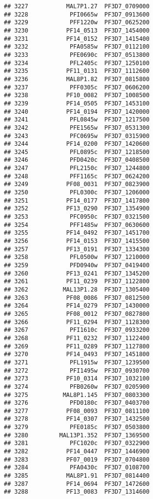 \documentclass{article}\usepackage[]{graphicx}\usepackage[]{color}
\makeatletter
\newenvironment{kframe}{%
 \def\at@end@of@kframe{}%
 \ifinner\ifhmode%
  \def\at@end@of@kframe{\end{minipage}}%
  \begin{minipage}{\columnwidth}%
 \fi\fi%
 \def\FrameCommand##1{\hskip\@totalleftmargin \hskip-\fboxsep
 \colorbox{shadecolor}{##1}\hskip-\fboxsep
     \hskip-\linewidth \hskip-\@totalleftmargin \hskip\columnwidth}%
 \MakeFramed {\advance\hsize-\width
   \@totalleftmargin\z@ \linewidth\hsize
   \@setminipage}}%
 {\par\unskip\endMakeFramed%
 \at@end@of@kframe}
\newenvironment{knitrout}{}{} %
\makeatother
\begin{document}
\begin{knitrout}
\begin{kframe}
\begin{verbatim}
## 3227           MAL7P1.27  PF3D7_0709000
## 3228            PFI0665w  PF3D7_0913600
## 3229            PFF1220w  PF3D7_0625200
## 3230           PF14_0513  PF3D7_1454000
## 3231           PF14_0152  PF3D7_1415400
## 3232            PFA0585w  PF3D7_0112100
## 3233            PFE0690c  PF3D7_0513800
## 3234            PFL2405c  PF3D7_1250100
## 3235           PF11_0131  PF3D7_1112600
## 3236           MAL8P1.82  PF3D7_0815800
## 3237            PFF0305c  PF3D7_0606200
## 3238           PF10_0082  PF3D7_1008500
## 3239           PF14_0505  PF3D7_1453100
## 3240           PF14_0194  PF3D7_1420000
## 3241            PFL0845w  PF3D7_1217500
## 3242            PFE1565w  PF3D7_0531300
## 3243            PFC0695w  PF3D7_0315900
## 3244           PF14_0200  PF3D7_1420600
## 3245            PFL0895c  PF3D7_1218500
## 3246            PFD0420c  PF3D7_0408500
## 3247            PFL2150c  PF3D7_1244800
## 3248            PFF1165c  PF3D7_0624200
## 3249           PF08_0031  PF3D7_0823900
## 3250            PFL0300c  PF3D7_1206000
## 3251           PF14_0177  PF3D7_1417800
## 3252           PF13_0290  PF3D7_1354900
## 3253            PFC0950c  PF3D7_0321500
## 3254            PFF1485w  PF3D7_0630600
## 3255           PF14_0492  PF3D7_1451700
## 3256           PF14_0153  PF3D7_1415500
## 3257           PF13_0191  PF3D7_1334300
## 3258            PFL0500w  PF3D7_1210000
## 3259            PFD0940w  PF3D7_0419400
## 3260           PF13_0241  PF3D7_1345200
## 3261           PF11_0239  PF3D7_1122800
## 3262          MAL13P1.28  PF3D7_1305400
## 3263           PF08_0086  PF3D7_0812500
## 3264           PF14_0279  PF3D7_1430000
## 3265           PF08_0012  PF3D7_0827800
## 3266           PF11_0294  PF3D7_1128300
## 3267            PFI1610c  PF3D7_0933200
## 3268           PF11_0232  PF3D7_1122400
## 3269           PF11_0289  PF3D7_1127800
## 3270           PF14_0493  PF3D7_1451800
## 3271            PFL1915w  PF3D7_1239500
## 3272            PFI1495w  PF3D7_0930700
## 3273           PF10_0314  PF3D7_1032100
## 3274            PFB0260w  PF3D7_0205900
## 3275          MAL8P1.145  PF3D7_0803300
## 3276            PFD0180c  PF3D7_0403700
## 3277           PF08_0093  PF3D7_0811100
## 3278           PF14_0307  PF3D7_1432500
## 3279            PFE0185c  PF3D7_0503800
## 3280         MAL13P1.352  PF3D7_1369500
## 3281            PFC1020c  PF3D7_0322900
## 3282           PF14_0447  PF3D7_1446900
## 3283           PF07_0019  PF3D7_0704800
## 3284            PFA0430c  PF3D7_0108700
## 3285           MAL8P1.91  PF3D7_0814400
## 3287           PF14_0694  PF3D7_1472600
## 3288           PF13_0083  PF3D7_1314600

\end{verbatim}
\end{kframe}
\end{knitrout}
\end{document}
